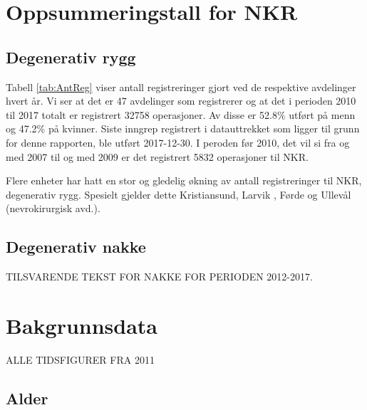 \documentclass [norsk,a4paper,twoside]{article}\usepackage[]{graphicx}\usepackage[]{color}
\makeatletter
\newenvironment{kframe}{%
 \def\at@end@of@kframe{}%
 \ifinner\ifhmode%
  \def\at@end@of@kframe{\end{minipage}}%
  \begin{minipage}{\columnwidth}%
 \fi\fi%
 \def\FrameCommand##1{\hskip\@totalleftmargin \hskip-\fboxsep
 \colorbox{shadecolor}{##1}\hskip-\fboxsep
     \hskip-\linewidth \hskip-\@totalleftmargin \hskip\columnwidth}%
 \MakeFramed {\advance\hsize-\width
   \@totalleftmargin\z@ \linewidth\hsize
   \@setminipage}}%
 {\par\unskip\endMakeFramed%
 \at@end@of@kframe}
\makeatother
\begin{document}
\clearpage



\section{Oppsummeringstall for NKR}

\begin{kframe}


{\ttfamily\noindent\bfseries{}}\end{kframe}


\subsection{Degenerativ rygg}
Tabell \ref{tab:AntReg} viser antall 
registreringer gjort ved de respektive avdelinger hvert år. Vi ser at det er  
47 avdelinger som registrerer og at det i perioden 2010 til 2017 totalt er registrert 32758 
operasjoner. Av disse er 52.8\% utført på menn og 47.2\% på kvinner.
Siste inngrep registrert i datauttrekket som ligger til grunn for denne rapporten, ble utført 
2017-12-30. I peroden før 2010, det vil si fra og med 2007 til og med 2009 er det 
registrert 5832 operasjoner til NKR. 
\par

Flere enheter har hatt en stor og gledelig økning av antall registreringer til NKR, degenerativ rygg. Spesielt gjelder dette Kristiansund, Larvik , Førde og Ullevål (nevrokirurgisk avd.).

\subsection{Degenerativ nakke}
TILSVARENDE TEKST FOR NAKKE FOR PERIODEN 2012-2017.

\clearpage



\section{Bakgrunnsdata}

ALLE TIDSFIGURER FRA 2011

\subsection{Alder}
\end{document}
